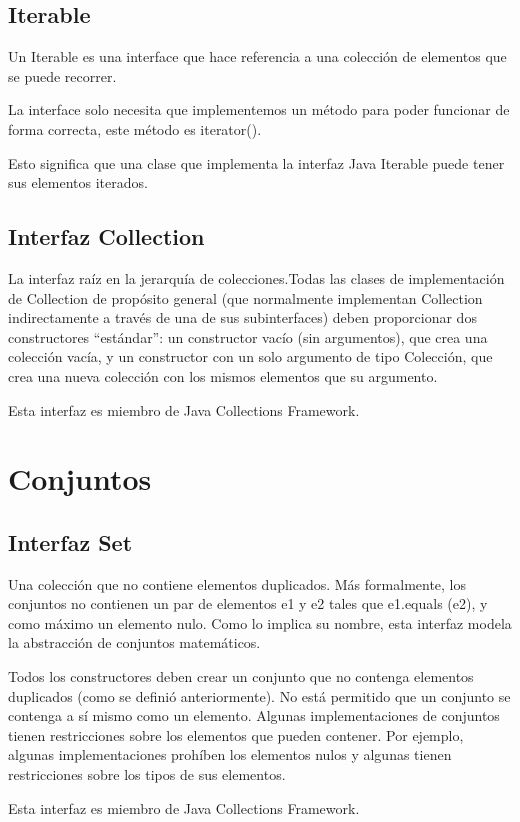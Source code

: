 \documentclass[11pt]{article}
\begin{document}
\subsection{Iterable}
\par
Un Iterable es una interface que hace referencia a una colección de 
elementos que se puede recorrer.
\par
La interface solo necesita que implementemos un método para poder 
funcionar de forma correcta, este método es iterator().
\par
Esto significa que una clase que implementa la interfaz Java Iterable 
puede tener sus elementos iterados. 

\subsection{Interfaz Collection}
\par
La interfaz raíz en la jerarquía de colecciones.Todas las clases de 
implementación de Collection de propósito general (que normalmente 
implementan Collection indirectamente a través de una de sus 
subinterfaces) deben proporcionar dos constructores ``estándar'': un 
constructor vacío (sin argumentos), que crea una colección vacía, y 
un constructor con un solo argumento de tipo Colección, que crea una 
nueva colección con los mismos elementos que su argumento. 

\par
Esta interfaz es miembro de Java Collections Framework.


\section{Conjuntos}

\subsection{Interfaz Set}
\par
Una colección que no contiene elementos duplicados. Más formalmente, 
los conjuntos no contienen un par de elementos e1 y e2 tales que 
e1.equals (e2), y como máximo un elemento nulo. Como lo implica su 
nombre, esta interfaz modela la abstracción de conjuntos matemáticos.
\par
Todos los constructores deben crear un conjunto que no contenga 
elementos duplicados (como se definió anteriormente). No está 
permitido que un conjunto se contenga a sí mismo como un elemento. 
Algunas implementaciones de conjuntos tienen restricciones sobre los 
elementos que pueden contener. Por ejemplo, algunas implementaciones 
prohíben los elementos nulos y algunas tienen restricciones sobre los 
tipos de sus elementos.
\par
Esta interfaz es miembro de Java Collections Framework.
\end{document}
